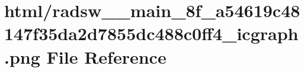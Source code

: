 \hypertarget{radsw____main__8f__a54619c48147f35da2d7855dc488c0ff4__icgraph_8png}{}\section{html/radsw\+\_\+\+\_\+main\+\_\+8f\+\_\+a54619c48147f35da2d7855dc488c0ff4\+\_\+icgraph.png File Reference}
\label{radsw____main__8f__a54619c48147f35da2d7855dc488c0ff4__icgraph_8png}
